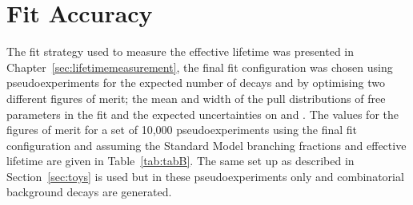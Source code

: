 \section{Fit Accuracy}
\label{sec:fitaccuracy}
The fit strategy used to measure the \bsmumu effective lifetime was presented in Chapter~\ref{sec:lifetimemeasurement}, the final fit configuration was chosen using pseudoexperiments for the expected number of decays and by optimising two different figures of merit; the mean and width of the pull distributions of free parameters in the fit and the expected uncertainties on \tmumu and \Gmumu. The values for the figures of merit for a set of 10,000 pseudoexperiments using the final fit configuration and assuming the Standard Model \bmumu branching fractions and effective lifetime are given in Table~\ref{tab:tabB}. The same set up as described in Section~\ref{sec:toys} is used but in these pseudoexperiments only \bsmumu and combinatorial background decays are generated. 
